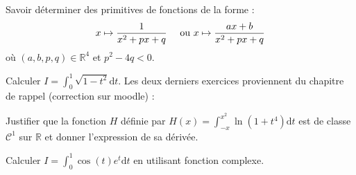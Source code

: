 \documentclass[twoside,a4paper,french,10pt]{VcCours}
\begin{document}
\begin{Exercice}
Savoir déterminer des primitives de fonctions de la forme :
  $$ x \mapsto \frac{1}{x^2+px+q} \quad \hbox{ ou } x \mapsto \frac{ax+b}{x^2+px+q}$$
  où $(a,b,p,q) \in \mathbb{R}^4$ et $p^2-4q<0$.
\end{Exercice} 

\begin{Exercice}
Calculer $I= \int_{0}^1 \sqrt{1-t^2} \text{d}t$.
Les deux derniers exercices proviennent du chapitre de rappel (correction sur moodle) : 
\end{Exercice}   

\begin{Exercice}
Justifier que la fonction $H$ définie par $H(x) = \int_{-x}^{x^2} \ln(1+t^4) \text{d}t$ est de classe $\mathcal{C}^1$ sur $\mathbb{R}$ et donner l'expression de sa dérivée.
\end{Exercice} 

\begin{Exercice}
Calculer $I = \int_{0}^{1} \cos(t) e^t \text{d}t$ en utilisant fonction complexe.
\end{Exercice} 
\end{document}
